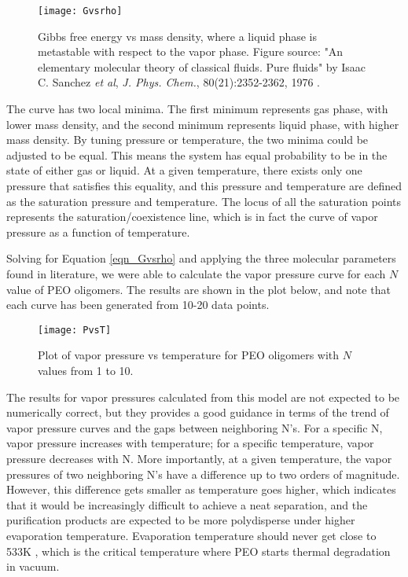 \begin{figure}[H]
\center
\texttt{[image: Gvsrho]}
\caption[Gibbs free energy vs mass density, where a liquid phase is metastable with respect to the vapor phase]{Gibbs free energy vs mass density, where a liquid phase is metastable with respect to the vapor phase. Figure source: "An elementary molecular theory of classical fluids. Pure
fluids" by Isaac C. Sanchez \textit{et al}, \textit{J. Phys. Chem.}, 80(21):2352-2362, 1976 \cite{Sanchez1976}.}
\label{fig:Gvsrho}
\end{figure}

The curve has two local minima. The first minimum represents gas phase, with lower mass density, and the second minimum represents liquid phase, with higher mass density. By tuning pressure or temperature, the two minima could be adjusted to be equal. This means the system has equal probability to be in the state of either gas or liquid. At a given temperature, there exists only one pressure that satisfies this equality, and this pressure and temperature are defined as the saturation pressure and temperature. The locus of all the saturation points represents the saturation/coexistence line, which is in fact the curve of vapor pressure as a function of temperature.

Solving for Equation \ref{eqn_Gvsrho} and applying the three molecular parameters found in literature, we were able to calculate the vapor pressure curve for each $N$ value of PEO oligomers. The results are shown in the plot below, and note that each curve has been generated from 10-20 data points.

\begin{figure}[H]
\center
\texttt{[image: PvsT]}
\caption{Plot of vapor pressure vs temperature for PEO oligomers with $N$ values from 1 to 10.}
\label{fig:VPvsT}
\end{figure}

The results for vapor pressures calculated from this model are not expected to be numerically correct, but they provides a good guidance in terms of the trend of vapor pressure curves and the gaps between neighboring N's. For a specific N, vapor pressure increases with temperature; for a specific temperature, vapor pressure decreases with N. More importantly, at a given temperature, the vapor pressures of two neighboring N's have a difference up to two orders of magnitude. However, this difference gets smaller as temperature goes higher, which indicates that it would be increasingly difficult to achieve a neat separation, and the purification products are expected to be more polydisperse under higher evaporation temperature. Evaporation temperature should never get close to 533K \cite{Choukourov2009}, which is the critical temperature where PEO starts thermal degradation in vacuum.

